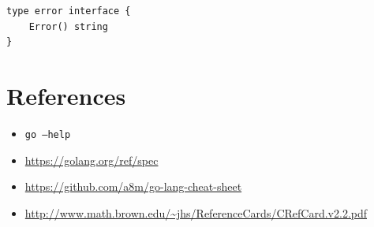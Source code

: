 \documentclass{article}
\begin{document}
\begin{multicols*}{3}
\begin{lstlisting}
type error interface {
    Error() string
}
\end{lstlisting}

  \parbox{\columnwidth}{
    \section*{References}

    \begin{itemize}[nosep]
    \item \texttt{go --help}
    \item \url{https://golang.org/ref/spec}
    \item \url{https://github.com/a8m/go-lang-cheat-sheet}
    \item \url{http://www.math.brown.edu/~jhs/ReferenceCards/CRefCard.v2.2.pdf}
    \end{itemize}

    \vspace{\baselineskip}
    \begin{center}
      \doclicenseText\\[0.25\baselineskip]

      \doclicenseImage
    \end{center}
  }
\end{multicols*}
\end{document}
